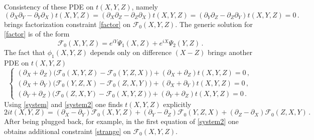 \documentclass[12pt]{article}
\begin{document}
Consistency of these PDE on $t(X,Y,Z)$, namely
\begin{equation}
(\partial_X\partial_Y-\partial_Y\partial_X)t(X,Y,Z)=(\partial_X\partial_Z-\partial_Z \partial_X)t(X,Y,Z)=(\partial_Y \partial_Z-\partial_Z\partial_Y)t(X,Y,Z)=0\,.
\end{equation}
brings factorization constraint \eqref{factor} on $\mathscr{F}_0(X,Y,Z)$. The generic solution for \eqref{factor} is of the form
\begin{equation}\label{factor_solution}
\mathscr{F}_0(X,Y,Z)=e^{iY}\Psi_1(X,Z)+e^{iX}\Psi_2(Y,Z)\,.
\end{equation}
The fact that $\phi_1(X,Y,Z)$ depends only on difference $(X-Z)$ brings another PDE on $t(X,Y,Z)$
\begin{equation}
\begin{cases}
(\partial_X+\partial_Z)\big(\mathscr{F}_0(X,Y,Z)-\mathscr{F}_0(Y,Z,X)\big)+(\partial_X+\partial_Z)t(X,Y,Z)=0\,,\\
(\partial_X+\partial_Y)\big(\mathscr{F}_0(Y,Z,X)-\mathscr{F}_0(Z,X,Y)\big)+(\partial_X+\partial_Y)t(X,Y,Z)=0\,,\\
(\partial_Y+\partial_Z)\big(\mathscr{F}_0(Z,X,Y)-\mathscr{F}_0(X,Y,Z)\big)+
(\partial_Y+\partial_Z)t(X,Y,Z)=0\,.
\end{cases}
\end{equation}
Using \eqref{system} and \eqref{system2} one finds $t(X,Y,Z)$ explicitly
\begin{equation}\label{t_solution}
2i t(X,Y,Z)=(\partial_X-\partial_Y)\mathscr{F}_0(X,Y,Z)+(\partial_Y-\partial_Z)\mathscr{F}_0(Y,Z,X)+(\partial_Z-\partial_X)\mathscr{F}_0(Z,X,Y)\,.
\end{equation}
After being plugged back, for example, in the first equation of \eqref{system2} one obtains additional constraint \eqref{strange} on $\mathscr{F}_0(X,Y,Z)$.
\end{document}
